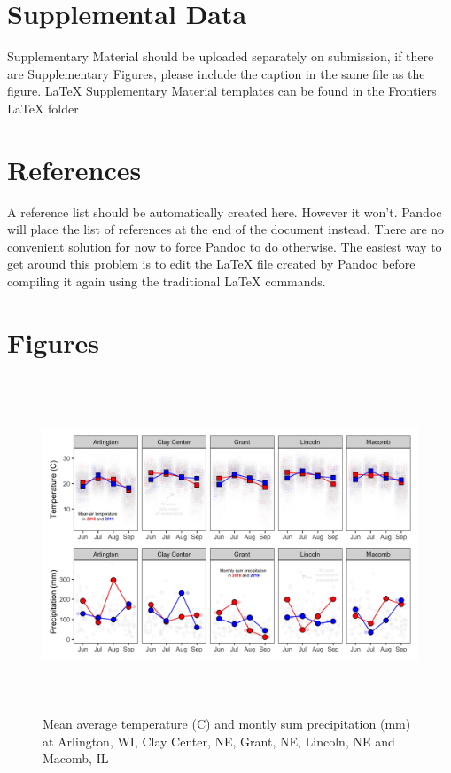 \documentclass[utf8]{frontiersSCNS}
\begin{document}
\hypertarget{supplemental-data}{%
\section{Supplemental Data}\label{supplemental-data}}

Supplementary Material should be uploaded separately on submission, if
there are Supplementary Figures, please include the caption in the same
file as the figure. LaTeX Supplementary Material templates can be found
in the Frontiers LaTeX folder

\hypertarget{references}{%
\section{References}\label{references}}

A reference list should be automatically created here. However it won't.
Pandoc will place the list of references at the end of the document
instead. There are no convenient solution for now to force Pandoc to do
otherwise. The easiest way to get around this problem is to edit the
LaTeX file created by Pandoc before compiling it again using the
traditional LaTeX commands.

\hypertarget{figures}{%
\section*{Figures}\label{figures}}

\begin{figure}

{\centering \includegraphics[width=160mm,height=100mm]{../data analysis/weather/Figure 1} 

}

\caption{Mean average temperature (C) and montly sum precipitation (mm) at Arlington, WI, Clay Center, NE, Grant, NE, Lincoln, NE and Macomb, IL}\label{fig:Figure-1}
\end{figure}
\end{document}
